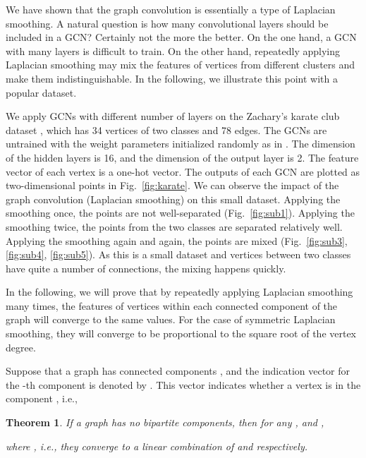 \documentclass[letterpaper]{article} \usepackage{aaai18}  \usepackage{times}  \usepackage{helvet}  \usepackage{courier}  \usepackage{url}  \usepackage{graphicx}  \usepackage{algorithm}
\begin{document}
We have shown that the graph convolution is essentially a type of Laplacian smoothing. A natural question is how many convolutional layers should be included in a GCN? Certainly not the more the better. On the one hand, a GCN with many layers is difficult to train. On the other hand, repeatedly applying Laplacian smoothing may mix the features of vertices from different clusters and make them indistinguishable. In the following, we illustrate this point with a popular dataset.









We apply GCNs with different number of layers on the Zachary's karate club dataset \cite{zachary1977information}, which has 34 vertices of two classes and 78 edges. The GCNs are untrained with the weight parameters initialized randomly as in \cite{glorot2010understanding}. The dimension of the hidden layers is 16, and the dimension of the output layer is 2. The feature vector of each vertex is a one-hot vector. The outputs of each GCN are plotted as two-dimensional points in Fig.~\ref{fig:karate}. We can observe the impact of the graph convolution (Laplacian smoothing) on this small dataset. Applying the smoothing once, the points are not well-separated (Fig.~\ref{fig:sub1}). Applying the smoothing twice, the points from the two classes are separated relatively well. Applying the smoothing again and again, the points are mixed (Fig.~\ref{fig:sub3}, \ref{fig:sub4}, \ref{fig:sub5}). As this is a small dataset and vertices between two classes have quite a number of connections, the mixing happens quickly.












In the following, we will prove that by repeatedly applying Laplacian smoothing many times, the features of vertices within each connected component of the graph will converge to the same values. For the case of symmetric Laplacian smoothing, they will converge to be proportional to the square root of the vertex degree.

Suppose that a graph  has  connected components , and the indication vector for the -th component is denoted by . This vector indicates whether a vertex is in the component , i.e.,

\newtheorem{theorem}{Theorem}
\begin{theorem}
    If a graph has no bipartite components, then for any , and ,
    
    where , i.e., they converge to a linear combination of  and  respectively.
\end{theorem}
\end{document}
